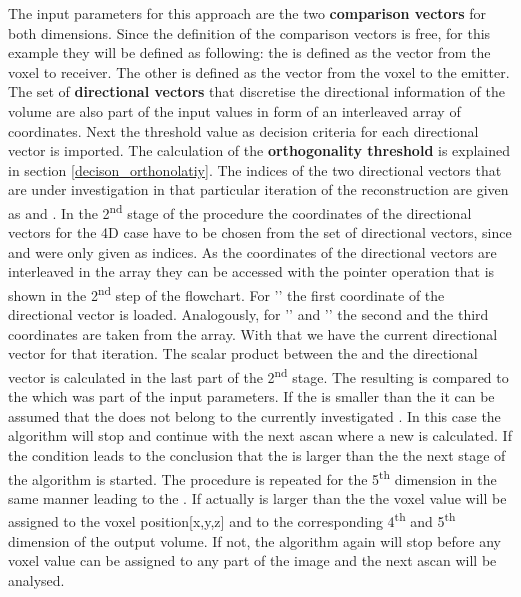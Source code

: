 The input parameters for this approach are the two \textbf{comparison vectors} for both dimensions. Since the definition of the comparison vectors is free, for this example they will be defined as following: the  is defined as the vector from the voxel to receiver. The other  is defined as the vector from the voxel to the emitter.
The set of \textbf{directional vectors} that discretise the directional information of the volume are also part of the input values in form of an interleaved array of coordinates. Next the threshold value as decision criteria for each directional vector is imported. The calculation of the \textbf{orthogonality threshold} is explained in section \ref{decison_orthonolatiy}. The indices of the two directional vectors that are under investigation in that particular iteration of the reconstruction are given as   and . 
In the 2\textsuperscript{nd} stage of the procedure the coordinates of the directional vectors for the 4D case have to be chosen from the set of directional vectors, since  and  were only given as indices. As the coordinates of the directional vectors are interleaved in the array they can be accessed with the pointer operation that is shown in the 2\textsuperscript{nd} step of the flowchart. For '' the first coordinate of the directional vector is loaded. Analogously, for '' and '' the second and the third coordinates are taken from the array.
With that we have the current directional vector  for that iteration.
The scalar product between the  and the directional vector  is calculated in the last part of the 2\textsuperscript{nd} stage. The resulting  is compared to the  which was part of the input parameters. If the  is smaller than the  it can be assumed that the  does not belong to the currently investigated . In this case the algorithm will stop and continue with the next \ac{ascan} where a new  is calculated. 
If the condition leads to the conclusion that the  is larger than the  the next stage of the algorithm is started.
The procedure is repeated for the 5\textsuperscript{th} dimension in the same manner leading to the . If  actually is larger than the  the voxel value will be assigned to the voxel position[x,y,z] and to the corresponding 4\textsuperscript{th} and 5\textsuperscript{th} dimension of the output volume. If not, the algorithm again will stop before any voxel value can be assigned to any part of the image and the next \ac{ascan} will be analysed.







